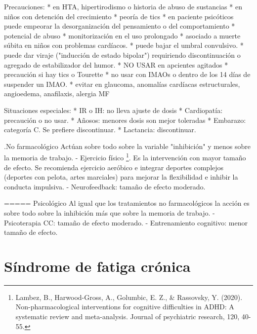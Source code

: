 \documentclass{scrbook}
\begin{document}
Precauciones:
* en HTA, hipertirodismo o historia de abuso de sustancias
* en niños con detención del crecimiento
* peoría de tics
* en paciente psicóticos puede empeorar la desorganización del pensamiento o del comportamiento
* potencial de abuso
* monitorización en el uso prolongado
* asociado a muerte súbita en niños con problemas cardíacos.
* puede bajar el umbral convulsivo.
* puede dar viraje ("inducción de estado bipolar") requiriendo discontinuación o agregado de estabilizador del humor.
* NO USAR en apcientes agitados
* precaución si hay tics o Tourette
* no usar con IMAOs o dentro de los 14 días de suspender un IMAO.
* evitar en glaucoma, anomalías cardíacas estructurales, angioedema, anafilaxis, alergia MF

Situaciones especiales:
* IR o IH: no lleva ajuste de dosis
* Cardiopatía: precaución o no usar.
* Añosos: menores dosis son mejor toleradas
* Embarazo: categoría C. Se prefiere discontinuar.
* Lactancia: discontinuar.

.No farmacológico
Actúan sobre todo sobre la variable "inhibición" y menos sobre la memoria de trabajo.
- Ejercicio físico \footnote{Lambez, B., Harwood-Gross, A., Golumbic, E. Z., \& Rassovsky, Y. (2020). Non-pharmacological interventions for cognitive difficulties in ADHD: A systematic review and meta-analysis. Journal of psychiatric research, 120, 40-55.}. Es la intervención con mayor tamaño de efecto. Se recomienda ejercicio aeróbico e integrar deportes complejos (deportes con pelota, artes marciales) para mejorar la flexibilidad e inhibir la conducta impulsiva.
- Neurofeedback: tamaño de efecto moderado.

===== Psicológico
Al igual que los tratamientos no farmacológicos la acción es sobre todo sobre la inhibición más que sobre la memoria de trabajo.
- Psicoterapia CC: tamaño de efecto moderado.
- Entrenamiento cognitivo: menor tamaño de efecto.
\chapter{Síndrome de fatiga crónica}
\end{document}
